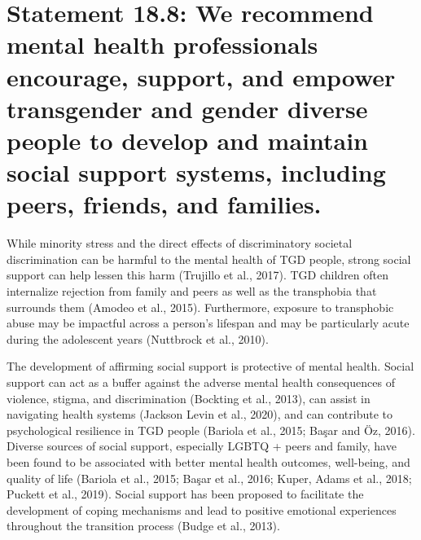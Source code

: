\documentclass[
]{book}
\begin{document}
\hypertarget{statement-18.8-we-recommend-mental-health-professionals-encourage-support-and-empower-transgender-and-gender-diverse-people-to-develop-and-maintain-social-support-systems-including-peers-friends-and-families.}{%
\section*{Statement 18.8: We recommend mental health professionals encourage, support, and empower transgender and gender diverse people to develop and maintain social support systems, including peers, friends, and families.}\label{statement-18.8-we-recommend-mental-health-professionals-encourage-support-and-empower-transgender-and-gender-diverse-people-to-develop-and-maintain-social-support-systems-including-peers-friends-and-families.}}

While minority stress and the direct effects of
discriminatory societal discrimination can be
harmful to the mental health of TGD people,
strong social support can help lessen this harm
(Trujillo et al., 2017). TGD children often internalize rejection from family and peers as well as
the transphobia that surrounds them (Amodeo
et al., 2015). Furthermore, exposure to transphobic
abuse may be impactful across a person's lifespan
and may be particularly acute during the adolescent years (Nuttbrock et al., 2010).

The development of affirming social support
is protective of mental health. Social support can
act as a buffer against the adverse mental health
consequences of violence, stigma, and discrimination (Bockting et al., 2013), can assist in navigating health systems (Jackson Levin et al.,
2020), and can contribute to psychological resilience in TGD people (Bariola et al., 2015; Başar
and Öz, 2016). Diverse sources of social support,
especially LGBTQ + peers and family, have been
found to be associated with better mental health
outcomes, well-being, and quality of life (Bariola
et al., 2015; Başar et al., 2016; Kuper, Adams
et al., 2018; Puckett et al., 2019). Social support
has been proposed to facilitate the development
of coping mechanisms and lead to positive emotional experiences throughout the transition process (Budge et al., 2013).
\end{document}
